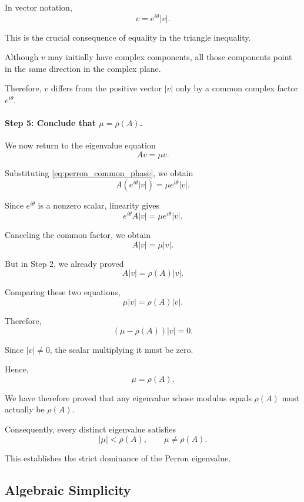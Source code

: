 \documentclass[11pt,a4paper]{article}
\theoremstyle{definition}
\theoremstyle{remark}
\begin{document}
In vector notation,
\begin{equation}
\boxed{
v=e^{i\theta}|v|.
}
\label{eq:perron_common_phase}
\end{equation}

This is the crucial consequence
of equality in the triangle inequality.

Although $v$ may initially
have complex components, all
those components point in
the same direction in the
complex plane.

Therefore, $v$ differs from
the positive vector $|v|$
only by a common complex
factor $e^{i\theta}$.


\paragraph{Step 5: Conclude that
$\mu=\rho(A)$.}

We now return to the
eigenvalue equation
\[
Av=\mu v.
\]

Substituting
\eqref{eq:perron_common_phase},
we obtain
\[
A(e^{i\theta}|v|)
=
\mu e^{i\theta}|v|.
\]

Since $e^{i\theta}$ is a
nonzero scalar, linearity gives
\[
e^{i\theta}A|v|
=
\mu e^{i\theta}|v|.
\]

Canceling the common factor,
we obtain
\begin{equation}
A|v|=\mu|v|.
\label{eq:perron_mu_abs_vector}
\end{equation}

But in Step 2, we already proved
\[
A|v|=\rho(A)|v|.
\]

Comparing these two equations,
\[
\mu|v|=\rho(A)|v|.
\]

Therefore,
\[
(\mu-\rho(A))|v|=0.
\]

Since $|v|\neq0$, the scalar
multiplying it must be zero.

Hence,
\[
\boxed{
\mu=\rho(A).
}
\]

We have therefore proved
that any eigenvalue whose
modulus equals $\rho(A)$
must actually be $\rho(A)$.

Consequently, every distinct
eigenvalue satisfies
\begin{equation}
\boxed{
|\mu|<\rho(A),
\qquad
\mu\neq\rho(A).
}
\label{eq:perron_strict_dominance}
\end{equation}

This establishes the strict
dominance of the Perron eigenvalue.


\subsection{Algebraic Simplicity}
\end{document}
